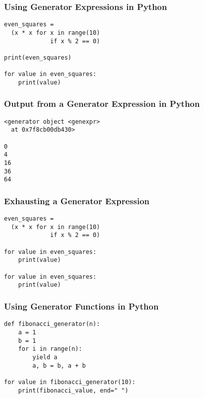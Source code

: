 \documentclass[14pt,aspectratio=169]{beamer}
\begin{document}
%
\begin{frame}[fragile]
  \frametitle{Using Generator Expressions in Python}
  \normalsize
  \begin{minipage}{6in}
    \vspace*{.2in}
    \begin{verbatim}
even_squares =
  (x * x for x in range(10)
             if x % 2 == 0)

print(even_squares)

for value in even_squares:
    print(value)
    \end{verbatim}
  \end{minipage}
\end{frame}

%
\begin{frame}[fragile]
  \frametitle{Output from a Generator Expression in Python}
  \normalsize
  \hspace*{.1in}
  \begin{minipage}{6in}
    \vspace*{.2in}
    \begin{verbatim}
<generator object <genexpr>
  at 0x7f8cb00db430>

0
4
16
36
64
    \end{verbatim}
  \end{minipage}
\end{frame}

%
\begin{frame}[fragile]
  \frametitle{Exhausting a Generator Expression}
  \normalsize
  \begin{minipage}{6in}
    \vspace*{.2in}
    \begin{verbatim}
even_squares =
  (x * x for x in range(10)
             if x % 2 == 0)

for value in even_squares:
    print(value)

for value in even_squares:
    print(value)
    \end{verbatim}
  \end{minipage}
\end{frame}

%
\begin{frame}[fragile]
  \frametitle{Using Generator Functions in Python}
  \normalsize
  \begin{minipage}{6in}
    \vspace*{.1in}
    \begin{verbatim}
def fibonacci_generator(n):
    a = 1
    b = 1
    for i in range(n):
        yield a
        a, b = b, a + b

for value in fibonacci_generator(10):
    print(fibonacci_value, end=" ")
    \end{verbatim}
  \end{minipage}
\end{frame}
\end{document}
